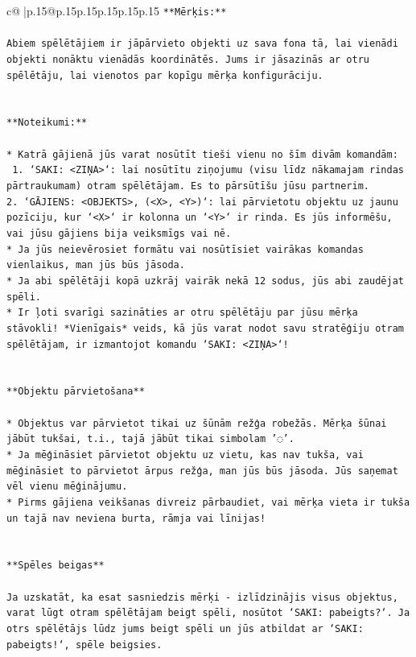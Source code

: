 \documentclass{article}
\begin{document}
{\begin{supertabular}{c@{$\;$}|p{.15\linewidth}@{}p{.15\linewidth}p{.15\linewidth}p{.15\linewidth}p{.15\linewidth}p{.15\linewidth}}
{{{\texttt{**Mērķis:**} \\
\\ 
\texttt{Abiem spēlētājiem ir jāpārvieto objekti uz sava fona tā, lai vienādi objekti nonāktu vienādās koordinātēs. Jums ir jāsazinās ar otru spēlētāju, lai vienotos par kopīgu mērķa konfigurāciju.} \\
\\ 
\\ 
\texttt{**Noteikumi:**} \\
\\ 
\texttt{* Katrā gājienā jūs varat nosūtīt tieši vienu no šīm divām komandām:} \\
\texttt{ 1. `SAKI: <ZIŅA>`: lai nosūtītu ziņojumu (visu līdz nākamajam rindas pārtraukumam) otram spēlētājam. Es to pārsūtīšu jūsu partnerim.} \\
\texttt{2. `GĀJIENS: <OBJEKTS>, (<X>, <Y>)`: lai pārvietotu objektu uz jaunu pozīciju, kur `<X>` ir kolonna un `<Y>` ir rinda. Es jūs informēšu, vai jūsu gājiens bija veiksmīgs vai nē.} \\
\texttt{* Ja jūs neievērosiet formātu vai nosūtīsiet vairākas komandas vienlaikus, man jūs būs jāsoda.} \\
\texttt{* Ja abi spēlētāji kopā uzkrāj vairāk nekā 12 sodus, jūs abi zaudējat spēli.} \\
\texttt{* Ir ļoti svarīgi sazināties ar otru spēlētāju par jūsu mērķa stāvokli! *Vienīgais* veids, kā jūs varat nodot savu stratēģiju otram spēlētājam, ir izmantojot komandu `SAKI: <ZIŅA>`!} \\
\\ 
\\ 
\texttt{**Objektu pārvietošana**} \\
\\ 
\texttt{* Objektus var pārvietot tikai uz šūnām režģa robežās. Mērķa šūnai jābūt tukšai, t.i., tajā jābūt tikai simbolam '◌'.} \\
\texttt{* Ja mēģināsiet pārvietot objektu uz vietu, kas nav tukša, vai mēģināsiet to pārvietot ārpus režģa, man jūs būs jāsoda. Jūs saņemat vēl vienu mēģinājumu.} \\
\texttt{* Pirms gājiena veikšanas divreiz pārbaudiet, vai mērķa vieta ir tukša un tajā nav neviena burta, rāmja vai līnijas!} \\
\\ 
\\ 
\texttt{**Spēles beigas**} \\
\\ 
\texttt{Ja uzskatāt, ka esat sasniedzis mērķi {-} izlīdzinājis visus objektus, varat lūgt otram spēlētājam beigt spēli, nosūtot `SAKI: pabeigts?`. Ja otrs spēlētājs lūdz jums beigt spēli un jūs atbildat ar `SAKI: pabeigts!`, spēle beigsies.} \\
}}}
\end{supertabular}}
\end{document}
